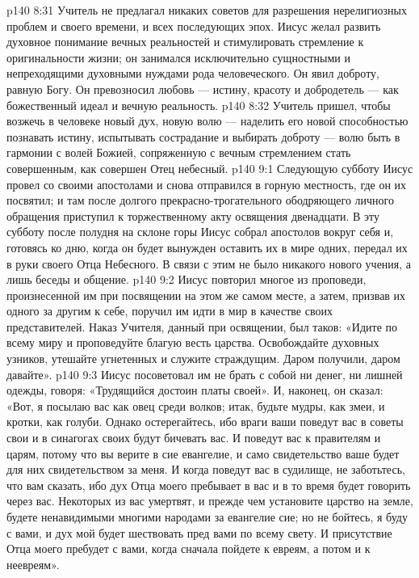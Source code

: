\vs p140 8:31 Учитель не предлагал никаких советов для разрешения нерелигиозных проблем и своего времени, и всех последующих эпох. Иисус желал развить духовное понимание вечных реальностей и стимулировать стремление к оригинальности жизни; он занимался исключительно сущностными и непреходящими духовными нуждами рода человеческого. Он явил доброту, равную Богу. Он превозносил любовь --- истину, красоту и добродетель --- как божественный идеал и вечную реальность.
\vs p140 8:32 Учитель пришел, чтобы возжечь в человеке новый дух, новую волю --- наделить его новой способностью познавать истину, испытывать сострадание и выбирать доброту --- волю быть в гармонии с волей Божией, сопряженную с вечным стремлением стать совершенным, как совершен Отец небесный.
\vs p140 9:1 Следующую субботу Иисус провел со своими апостолами и снова отправился в горную местность, где он их посвятил; и там после долгого прекрасно\hyp{}трогательного ободряющего личного обращения приступил к торжественному акту освящения двенадцати. В эту субботу после полудня на склоне горы Иисус собрал апостолов вокруг себя и, готовясь ко дню, когда он будет вынужден оставить их в мире одних, передал их в руки своего Отца Небесного. В связи с этим не было никакого нового учения, а лишь беседы и общение.
\vs p140 9:2 Иисус повторил многое из проповеди, произнесенной им при посвящении на этом же самом месте, а затем, призвав их одного за другим к себе, поручил им идти в мир в качестве своих представителей. Наказ Учителя, данный при освящении, был таков: «Идите по всему миру и проповедуйте благую весть царства. Освобождайте духовных узников, утешайте угнетенных и служите страждущим. Даром получили, даром давайте».
\vs p140 9:3 Иисус посоветовал им не брать с собой ни денег, ни лишней одежды, говоря: «Трудящийся достоин платы своей». И, наконец, он сказал: «Вот, я посылаю вас как овец среди волков; итак, будьте мудры, как змеи, и кротки, как голуби. Однако остерегайтесь, ибо враги ваши поведут вас в советы свои и в синагогах своих будут бичевать вас. И поведут вас к правителям и царям, потому что вы верите в сие евангелие, и само свидетельство ваше будет для них свидетельством за меня. И когда поведут вас в судилище, не заботьтесь, что вам сказать, ибо дух Отца моего пребывает в вас и в то время будет говорить через вас. Некоторых из вас умертвят, и прежде чем установите царство на земле, будете ненавидимыми многими народами за евангелие сие; но не бойтесь, я буду с вами, и дух мой будет шествовать пред вами по всему свету. И присутствие Отца моего пребудет с вами, когда сначала пойдете к евреям, а потом и к неевреям».
